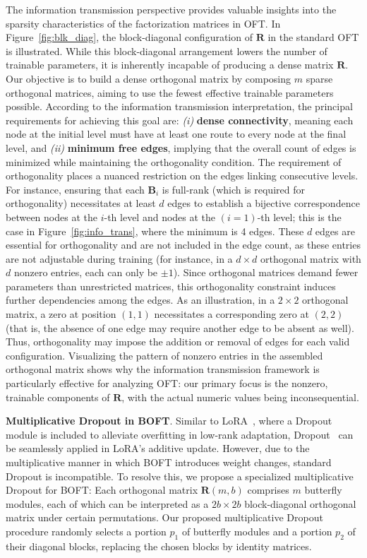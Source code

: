 The information transmission perspective provides valuable insights into the sparsity characteristics of the factorization matrices in OFT. In Figure~\ref{fig:blk_diag}, the block-diagonal configuration of $\bm{R}$ in the standard OFT is illustrated. While this block-diagonal arrangement lowers the number of trainable parameters, it is inherently incapable of producing a dense matrix $\bm{R}$. Our objective is to build a dense orthogonal matrix by composing $m$ sparse orthogonal matrices, aiming to use the fewest effective trainable parameters possible. According to the information transmission interpretation, the principal requirements for achieving this goal are: \emph{(i)} \textbf{dense connectivity}, meaning each node at the initial level must have at least one route to every node at the final level, and \emph{(ii)} \textbf{minimum free edges}, implying that the overall count of edges is minimized while maintaining the orthogonality condition. The requirement of orthogonality places a nuanced restriction on the edges linking consecutive levels. For instance, ensuring that each $\bm{B}_i$ is full-rank (which is required for orthogonality) necessitates at least $d$ edges to establish a bijective correspondence between nodes at the $i$-th level and nodes at the $(i=1)$-th level; this is the case in Figure~\ref{fig:info_trans}, where the minimum is 4 edges. These $d$ edges are essential for orthogonality and are not included in the edge count, as these entries are not adjustable during training (for instance, in a $d\times d$ orthogonal matrix with $d$ nonzero entries, each can only be $\pm 1$). Since orthogonal matrices demand fewer parameters than unrestricted matrices, this orthogonality constraint induces further dependencies among the edges. As an illustration, in a $2\times 2$ orthogonal matrix, a zero at position $(1,1)$ necessitates a corresponding zero at $(2,2)$ (that is, the absence of one edge may require another edge to be absent as well). Thus, orthogonality may impose the addition or removal of edges for each valid configuration. Visualizing the pattern of nonzero entries in the assembled orthogonal matrix shows why the information transmission framework is particularly effective for analyzing OFT: our primary focus is the nonzero, trainable components of $\bm{R}$, with the actual numeric values being inconsequential.

\textbf{Multiplicative Dropout in BOFT}. Similar to LoRA~\cite{hulora2022}, where a Dropout module is included to alleviate overfitting in low-rank adaptation, Dropout~\cite{srivastava2014dropout} can be seamlessly applied in LoRA’s additive update. However, due to the multiplicative manner in which BOFT introduces weight changes, standard Dropout is incompatible. To resolve this, we propose a specialized multiplicative Dropout for BOFT: Each orthogonal matrix $\bm{R}(m,b)$ comprises $m$ butterfly modules, each of which can be interpreted as a $2b\times 2b$ block-diagonal orthogonal matrix under certain permutations. Our proposed multiplicative Dropout procedure randomly selects a portion $p_1$ of butterfly modules and a portion $p_2$ of their diagonal blocks, replacing the chosen blocks by identity matrices.


